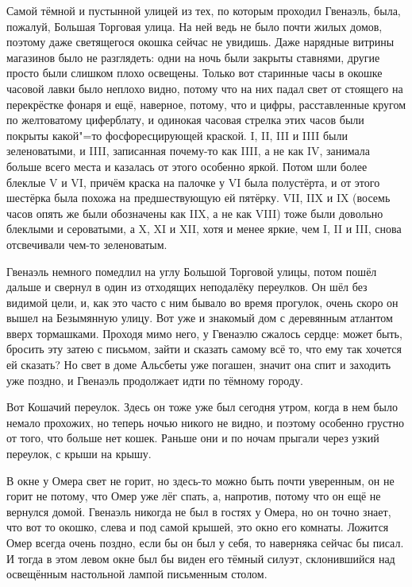 Самой тёмной и пустынной улицей из тех, по которым проходил Гвенаэль, была,
пожалуй, Большая Торговая улица.
На ней ведь не было почти жилых домов, поэтому даже светящегося окошка сейчас не
увидишь.
Даже нарядные витрины магазинов было не разглядеть: одни на ночь были закрыты
ставнями, другие просто были слишком плохо освещены.
Только вот старинные часы в окошке часовой лавки было неплохо видно, потому что
на них падал свет от стоящего на перекрёстке фонаря и ещё, наверное, потому, что
и цифры, расставленные кругом по желтоватому циферблату, и одинокая часовая
стрелка этих часов были покрыты какой"=то фосфоресцирующей краской.
I, II, III и IIII были зеленоватыми, и IIII, записанная почему-то как IIII, а не
как IV, занимала больше всего места и казалась от этого особенно яркой.
Потом шли более блеклые V и VI, причём краска на палочке у VI была полустёрта,
и от этого шестёрка была похожа на предшествующую ей пятёрку.
VII, IIX и IX (восемь часов опять же были обозначены как IIX, а не как VIII)
тоже были довольно блеклыми и сероватыми, а X, XI и XII, хотя и менее яркие, чем
I, II и III, снова отсвечивали чем-то зеленоватым.

Гвенаэль немного помедлил на углу Большой Торговой улицы, потом пошёл дальше и
свернул в один из отходящих неподалёку переулков.
Он шёл без видимой цели, и, как это часто с ним бывало во время прогулок, очень
скоро он вышел на Безымянную улицу.
Вот уже и знакомый дом с деревянным атлантом вверх тормашками.
Проходя мимо него, у Гвенаэлю сжалось сердце: может быть, бросить эту затею с
письмом, зайти и сказать самому всё то, что ему так хочется ей сказать?
Но свет в доме Альсбеты уже погашен, значит она спит и заходить уже поздно, и
Гвенаэль продолжает идти по тёмному городу.

Вот Кошачий переулок.
Здесь он тоже уже был сегодня утром, когда в нем было немало прохожих, но теперь
ночью никого не видно, и поэтому особенно грустно от того, что больше нет кошек.
Раньше они и по ночам прыгали через узкий переулок, с крыши на крышу.

В окне у Омера свет не горит, но здесь-то можно быть почти уверенным, он не
горит не потому, что Омер уже лёг спать, а, напротив, потому что он ещё не
вернулся домой.
Гвенаэль никогда не был в гостях у Омера, но он точно знает, что вот то окошко,
слева и под самой крышей, это окно его комнаты.
Ложится Омер всегда очень поздно, если бы он был у себя, то наверняка сейчас бы
писал.
И тогда в этом левом окне был бы виден его тёмный силуэт, склонившийся над
освещённым настольной лампой письменным столом.

